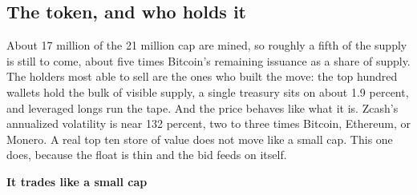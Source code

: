 \documentclass[11pt]{article}
\newcommand{\charttitle}[1]{{\sffamily\bfseries\footnotesize\color{ink} #1}\par\vspace{1pt}}
\newcommand{\chartcap}[1]{\par\vspace{1pt}{\scriptsize\sffamily\color{mid} #1}\par}
\begin{document}
\subsection{The token, and who holds it}
\noindent
\begin{minipage}[t]{0.56\linewidth}
About 17 million of the 21 million cap are mined, so roughly a fifth of the supply is still to come, about five times Bitcoin's remaining issuance as a share of supply. The holders most able to sell are the ones who built the move: the top hundred wallets hold the bulk of visible supply, a single treasury sits on about 1.9 percent, and leveraged longs run the tape. And the price behaves like what it is. Zcash's annualized volatility is near 132 percent, two to three times Bitcoin, Ethereum, or Monero. A real top ten store of value does not move like a small cap. This one does, because the float is thin and the bid feeds on itself.
\end{minipage}\hfill
\begin{minipage}[t]{0.4\linewidth}
\charttitle{It trades like a small cap}
\chartcap{90 day annualized volatility.}
\end{minipage}
\end{document}
